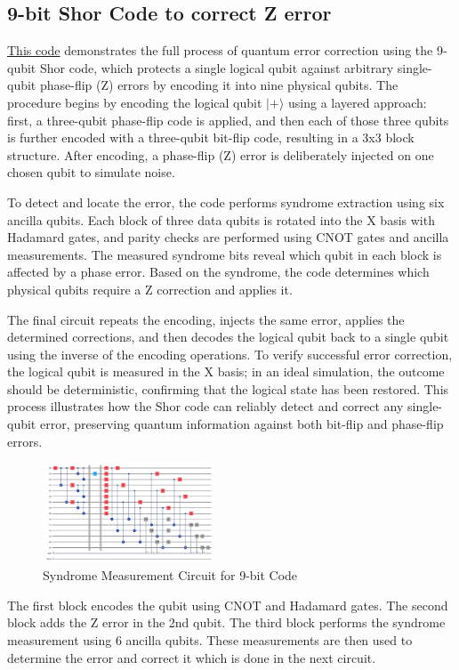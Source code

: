 \documentclass[conference]{IEEEtran}
\begin{document}
\subsection{9-bit Shor Code to correct Z error}
\href{https://github.com/jaymehta132/QuantumErrorCorrection-EE7001/blob/main/Codes/scripts/9bitCode.py}{This code} demonstrates the full process of quantum error correction using the 9-qubit Shor code, which protects a single logical qubit against arbitrary single-qubit phase-flip (Z) errors by encoding it into nine physical qubits. The procedure begins by encoding the logical qubit $|+\rangle$ using a layered approach: first, a three-qubit phase-flip code is applied, and then each of those three qubits is further encoded with a three-qubit bit-flip code, resulting in a 3x3 block structure. After encoding, a phase-flip (Z) error is deliberately injected on one chosen qubit to simulate noise.

To detect and locate the error, the code performs syndrome extraction using six ancilla qubits. Each block of three data qubits is rotated into the X basis with Hadamard gates, and parity checks are performed using CNOT gates and ancilla measurements. The measured syndrome bits reveal which qubit in each block is affected by a phase error. Based on the syndrome, the code determines which physical qubits require a Z correction and applies it.

The final circuit repeats the encoding, injects the same error, applies the determined corrections, and then decodes the logical qubit back to a single qubit using the inverse of the encoding operations. To verify successful error correction, the logical qubit is measured in the X basis; in an ideal simulation, the outcome should be deterministic, confirming that the logical state has been restored. This process illustrates how the Shor code can reliably detect and correct any single-qubit error, preserving quantum information against both bit-flip and phase-flip errors.

\begin{figure}[h]
    \centering
    \includegraphics[width=0.45\textwidth]{../Codes/results/9bitCode/SyndromeMeasurementCircuit.png}
    \caption{Syndrome Measurement Circuit for 9-bit Code}
    \label{fig:9bitCodeResults}
\end{figure}
The first block encodes the qubit using CNOT and Hadamard gates. The second block adds the Z error in the 2nd qubit. The third block performs the syndrome measurement using 6 ancilla qubits. These measurements are then used to determine the error and correct it which is done in the next circuit.
\end{document}
